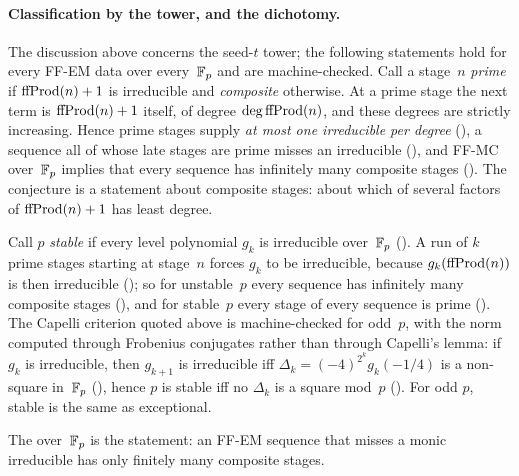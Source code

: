 \paragraph{Classification by the tower, and the dichotomy.}
\label{sec:ff-classification}
The discussion above concerns the seed-$t$ tower; the following
statements hold for every FF-EM data over every~$\mathbb{F}_p$ and are
machine-checked.  Call a stage~$n$ \emph{prime} if $\mathrm{ffProd}(n)+1$ is
irreducible and \emph{composite} otherwise.  At a prime stage the next
term is $\mathrm{ffProd}(n)+1$ itself, of degree $\deg\mathrm{ffProd}(n)$, and these
degrees are strictly increasing.  Hence prime stages supply \emph{at
most one irreducible per degree}
(),
a sequence all of whose late stages are prime misses an irreducible
(),
and FF-MC over~$\mathbb{F}_p$ implies that every sequence has infinitely many
composite stages
().
The conjecture is a statement about composite stages: about which of
several factors of $\mathrm{ffProd}(n)+1$ has least degree.

Call $p$ \emph{stable} if every level polynomial $g_k$ is irreducible
over~$\mathbb{F}_p$ ().
A run of $k$ prime stages starting at stage~$n$ forces $g_k$ to be
irreducible, because $g_k(\mathrm{ffProd}(n))$ is then irreducible
();
so for unstable~$p$ every sequence has infinitely many composite stages
(),
and for stable~$p$ every stage of every sequence is prime
().
The Capelli criterion quoted above is machine-checked for odd~$p$, with
the norm computed through Frobenius conjugates rather than through
Capelli's lemma: if $g_k$ is irreducible, then $g_{k+1}$ is irreducible
iff $\Delta_k = (-4)^{2^k} g_k(-1/4)$ is a non-square in~$\mathbb{F}_p$
(),
hence $p$ is stable iff no $\Delta_k$ is a square mod~$p$
().  For odd
$p$, stable is the same as exceptional.

\begin{definition}
\label{def:ff-dichotomy}
The  over~$\mathbb{F}_p$ is the statement: an FF-EM sequence
that misses a monic irreducible has only finitely many composite stages.
\end{definition}

